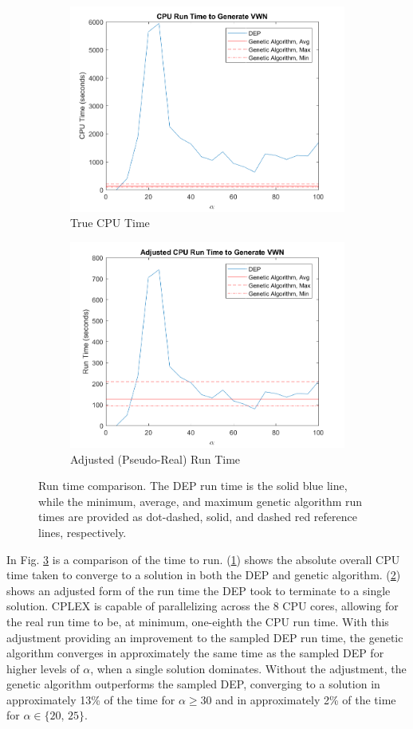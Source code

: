 \documentclass[onecolumn,draftcls]{IEEEtran}
\begin{document}
\begin{figure}[h]
\begin{subfigure}{.5\textwidth}
	\centering
	\includegraphics[width=.8\linewidth]{Figures/ComparisonTime}
	\caption{True CPU Time}
	\label{fig:CPUTimeComp}
\end{subfigure}
\begin{subfigure}{.5\textwidth}
	\centering
	\includegraphics[width=.8\linewidth]{Figures/ComparisonTimeAdjusted}
	\caption{Adjusted (Pseudo-Real) Run Time}
	\label{fig:CPUTimeCompAdj}
\end{subfigure}
\caption{Run time comparison.  The DEP run time is the solid blue line, while the minimum, average, and maximum genetic algorithm run times are provided as dot-dashed, solid, and dashed red reference lines, respectively.}
\label{fig:CPUTime}
\end{figure}

In Fig. \ref{fig:CPUTime} is a comparison of the time to run.  (\ref{fig:CPUTimeComp}) shows the absolute overall CPU time taken to converge to a solution in both the DEP and genetic algorithm.  (\ref{fig:CPUTimeCompAdj}) shows an adjusted form of the run time the DEP took to terminate to a single solution.  CPLEX is capable of parallelizing across the 8 CPU cores, allowing for the real run time to be, at minimum, one-eighth the CPU run time.  With this adjustment providing an improvement to the sampled DEP run time, the genetic algorithm converges in approximately the same time as the sampled DEP for higher levels of $\alpha$, when a single solution dominates.  Without the adjustment, the genetic algorithm outperforms the sampled DEP, converging to a solution in approximately 13\% of the time for $\alpha \geq 30$ and in approximately 2\% of the time for $\alpha \in \{20,\, 25\}$.
\end{document}

